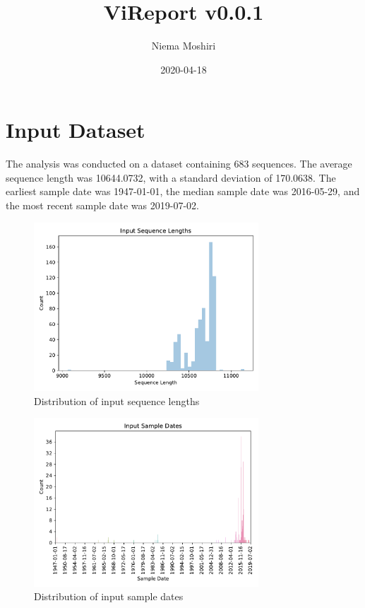 \documentclass{article}
\title{\vspace{-2.0cm}ViReport v0.0.1}
\author{Niema Moshiri}
\date{2020-04-18}
\begin{document}
\maketitle

\section{Input Dataset}
The analysis was conducted on a dataset containing 683 sequences. The average sequence length was 10644.0732, with a standard deviation of 170.0638. The earliest sample date was 1947-01-01, the median sample date was 2016-05-29, and the most recent sample date was 2019-07-02.

\begin{figure}[h]
\centering
\includegraphics[width=0.75\textwidth,keepaspectratio]{./figs/input_sequence_lengths.pdf}
\caption{Distribution of input sequence lengths}
\end{figure}



\begin{figure}[h]
\centering
\includegraphics[width=0.75\textwidth,keepaspectratio]{./figs/input_sample_dates.pdf}
\caption{Distribution of input sample dates}
\end{figure}
\end{document}

